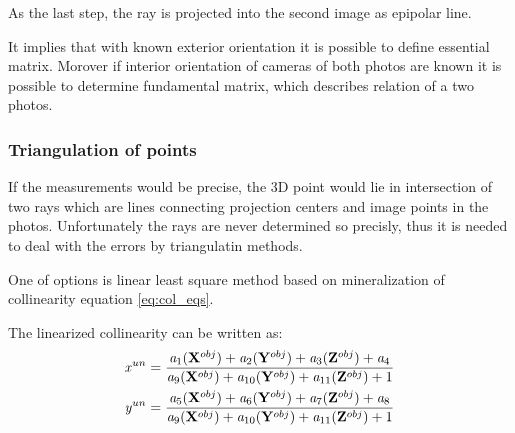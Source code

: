 \documentclass[a4paper,12pt]{article}
\newcommand{\evect}[1]{
{\bf #1}
}
\newcommand{\escal}[1]{
{\it #1}
}
\begin{document}
As the last step, the ray is projected into the second image as epipolar line.


It implies that with known exterior orientation it is possible to define essential matrix. 
Morover if interior orientation of cameras of both photos are known it is possible to determine fundamental matrix,
which describes relation of a two photos.

\subsubsection{Triangulation of points}
\label{eq:triang}

If the measurements would be precise, the 3D point 
would lie in intersection of two rays which are lines connecting projection centers and image points 
in the photos. Unfortunately the rays are never determined so precisly, thus it is needed to deal 
 with the errors by triangulatin methods. 

One of options is linear least square method based 
on mineralization of collinearity equation \eqref{eq:col_eqs}.

The linearized collinearity can be written as:  
\begin{equation}
\label{eq:col_eqs}
\begin{split}
&\escal{x}^{un} = \frac{\escal{a}_{1}(\evect{X}^{obj}) + 
                                  \escal{a}_{2}(\evect{Y}^{obj}) + 
                                  \escal{a}_{3}(\evect{Z}^{obj}) +
                                  \escal{a}_{4}
                                  }{
				  \escal{a}_{9}(\evect{X}^{obj}) + 
                                  \escal{a}_{10}(\evect{Y}^{obj}) + 
                                  \escal{a}_{11}(\evect{Z}^{obj}) +
                                   1  
                                  } \\
&\escal{y}^{un} = \frac{\escal{a}_{5}(\evect{X}^{obj}) + 
                                  \escal{a}_{6}(\evect{Y}^{obj}) + 
                                  \escal{a}_{7}(\evect{Z}^{obj}) +                                 
                                  \escal{a}_{8}
                                  }{
				  \escal{a}_{9}(\evect{X}^{obj}) + 
                                  \escal{a}_{10}(\evect{Y}^{obj}) + 
                                  \escal{a}_{11}(\evect{Z}^{obj}) +    
                                  1
                                  }
\end{split}
\end{equation}
 
\end{document}
